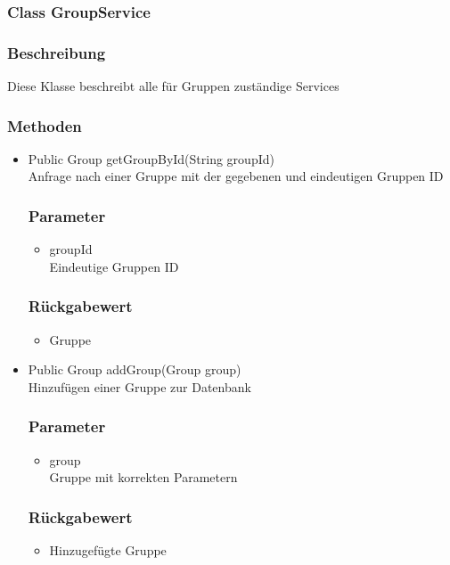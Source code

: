\documentclass[a4paper]{scrreprt}
\begin{document}
\subsubsection{Class GroupService}
\subsubsection*{Beschreibung}
Diese Klasse beschreibt alle für Gruppen zuständige Services

\subsubsection*{Methoden}
\begin{addmargin}[25pt]{0pt}
\begin{itemize}

\item Public Group getGroupById(String groupId)\\
	Anfrage nach einer Gruppe mit der gegebenen und eindeutigen Gruppen ID
	\subsubsection*{Parameter}
	\begin{itemize}
	\item groupId \\
		Eindeutige Gruppen ID
	\end{itemize}
	\subsubsection*{Rückgabewert}
	\begin{itemize}
	\item Gruppe 
	\end{itemize}
	
\item Public Group addGroup(Group group)\\
	Hinzufügen einer Gruppe zur Datenbank
	\subsubsection*{Parameter}
	\begin{itemize}
	\item group \\
		Gruppe mit korrekten Parametern
	\end{itemize}
	\subsubsection*{Rückgabewert}
	\begin{itemize}
	\item Hinzugefügte Gruppe 
	\end{itemize}
	

\end{itemize}
\end{addmargin}
\end{document}
